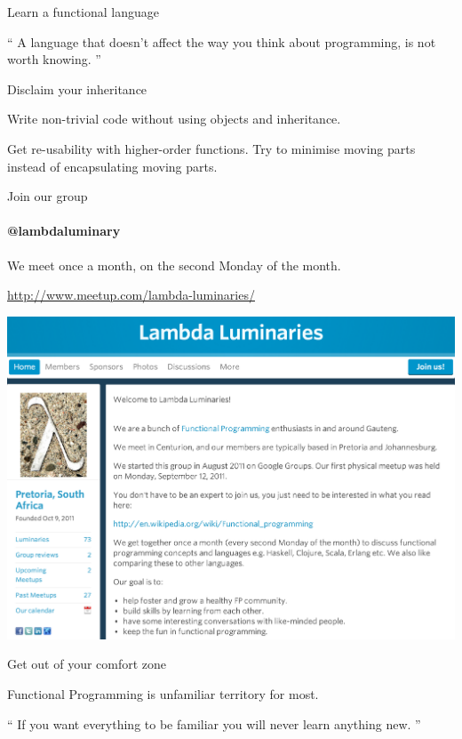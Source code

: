 \documentclass[mathserif]{beamer}
\begin{document}
\begin{frame}{Learn a functional language}

\begin{exampleblock}{}
  {\Large ``
    A language that doesn't affect the way you think about programming, is not worth knowing.
  ''}
  \vskip5mm
  \hspace*{}
\end{exampleblock}

\end{frame}

\begin{frame}{Disclaim your inheritance}

  {\Huge Write non-trivial code without using objects and inheritance.}
  \vskip5mm
  
  {\Large Get \alert{re-usability} with higher-order functions.}
  \vskip2mm
  {\Large Try to \alert{minimise moving parts} instead of encapsulating moving parts.}
  {\small\cite{mfeathers}}

\end{frame}

\begin{frame}{Join our group}
  \framesubtitle{@lambdaluminary}
  We meet once a month, on the second Monday of the month.

  \url{http://www.meetup.com/lambda-luminaries/}
  \begin{center}
    \includegraphics[scale=0.2]{img/ScreenShotLambdaLuminaries.png}
  \end{center}
\end{frame}

\begin{frame}{Get out of your comfort zone}

  {\Large Functional Programming is unfamiliar territory for most.}

\begin{exampleblock}{}
  {\Large ``
    If you want everything to be familiar you will never learn anything new.
  ''}
  \vskip5mm
  \hspace*{}
\end{exampleblock}

\end{frame}
\end{document}
